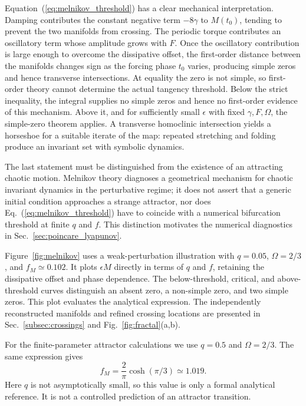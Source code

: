 \documentclass[aps,prb,reprint,floatfix]{revtex4-2}
\begin{document}
Equation~(\ref{eq:melnikov_threshold}) has a clear mechanical interpretation. Damping contributes the constant negative term $-8\gamma$ to $M(t_0)$, tending to prevent the two manifolds from crossing. The periodic torque contributes an oscillatory term whose amplitude grows with $F$. Once the oscillatory contribution is large enough to overcome the dissipative offset, the first-order distance between the manifolds changes sign as the forcing phase $t_0$ varies, producing simple zeros and hence transverse intersections. At equality the zero is not simple, so first-order theory cannot determine the actual tangency threshold. Below the strict inequality, the integral supplies no simple zeros and hence no first-order evidence of this mechanism. Above it, and for sufficiently small $\epsilon$ with fixed $\gamma,F,\Omega$, the simple-zero theorem applies. A transverse homoclinic intersection yields a horseshoe for a suitable iterate of the map: repeated stretching and folding produce an invariant set with symbolic dynamics.\cite{Wiggins2003}

The last statement must be distinguished from the existence of an attracting chaotic motion. Melnikov theory diagnoses a geometrical mechanism for chaotic invariant dynamics in the perturbative regime; it does not assert that a generic initial condition approaches a strange attractor, nor does Eq.~(\ref{eq:melnikov_threshold}) have to coincide with a numerical bifurcation threshold at finite $q$ and $f$. This distinction motivates the numerical diagnostics in Sec.~\ref{sec:poincare_lyapunov}.

Figure~\ref{fig:melnikov} uses a weak-perturbation illustration with $q=0.05$, $\Omega=2/3$, and $f_M\simeq0.102$. It plots $\epsilon M$ directly in terms of $q$ and $f$, retaining the dissipative offset and phase dependence. The below-threshold, critical, and above-threshold curves distinguish an absent zero, a non-simple zero, and two simple zeros. This plot evaluates the analytical expression. The independently reconstructed manifolds and refined crossing locations are presented in Sec.~\ref{subsec:crossings} and Fig.~\ref{fig:fractal}(a,b).

For the finite-parameter attractor calculations we use $q=0.5$ and $\Omega=2/3$. The same expression gives
\begin{equation}
 f_M=\frac{2}{\pi}\cosh(\pi/3)\simeq1.019.
\label{eq:melnikov_numeric}
\end{equation}
Here $q$ is not asymptotically small, so this value is only a formal analytical reference. It is not a controlled prediction of an attractor transition.
\end{document}
